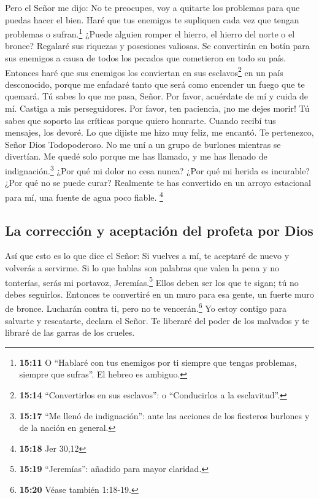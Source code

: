  Pero el Señor me dijo: No te preocupes, voy a quitarte
los problemas para que puedas hacer el bien. Haré que tus enemigos te
supliquen cada vez que tengan problemas o sufran.\footnote{\textbf{15:11}
  O ``Hablaré con tus enemigos por ti siempre que tengas problemas,
  siempre que sufras''. El hebreo es ambiguo.}  ¿Puede
alguien romper el hierro, el hierro del norte o el bronce?
 Regalaré sus riquezas y posesiones valiosas. Se
convertirán en botín para sus enemigos a causa de todos los pecados que
cometieron en todo su país.  Entonces haré que sus
enemigos los conviertan en sus esclavos\footnote{\textbf{15:14}
  ``Convertirlos en sus esclavos'': o ``Conducirlos a la esclavitud''.}
en un país desconocido, porque me enfadaré tanto que será como encender
un fuego que te quemará.  Tú sabes lo que me pasa, Señor.
Por favor, acuérdate de mí y cuida de mí. Castiga a mis perseguidores.
Por favor, ten paciencia, ¡no me dejes morir! Tú sabes que soporto las
críticas porque quiero honrarte.  Cuando recibí tus
mensajes, los devoré. Lo que dijiste me hizo muy feliz, me encantó. Te
pertenezco, Señor Dios Todopoderoso.  No me uní a un
grupo de burlones mientras se divertían. Me quedé solo porque me has
llamado, y me has llenado de indignación.\footnote{\textbf{15:17} ``Me
  llenó de indignación'': ante las acciones de los fiesteros burlones y
  de la nación en general.}  ¿Por qué mi dolor no cesa
nunca? ¿Por qué mi herida es incurable? ¿Por qué no se puede curar?
Realmente te has convertido en un arroyo estacional para mí, una fuente
de agua poco fiable. \footnote{\textbf{15:18} Jer 30,12}

\hypertarget{la-correcciuxf3n-y-aceptaciuxf3n-del-profeta-por-dios}{%
\subsection{La corrección y aceptación del profeta por
Dios}\label{la-correcciuxf3n-y-aceptaciuxf3n-del-profeta-por-dios}}

 Así que esto es lo que dice el Señor: Si vuelves a mí,
te aceptaré de nuevo y volverás a servirme. Si lo que hablas son
palabras que valen la pena y no tonterías, serás mi portavoz,
Jeremías.\footnote{\textbf{15:19} ``Jeremías'': añadido para mayor
  claridad.} Ellos deben ser los que te sigan; tú no debes seguirlos.
 Entonces te convertiré en un muro para esa gente, un
fuerte muro de bronce. Lucharán contra ti, pero no te
vencerán.\footnote{\textbf{15:20} Véase también 1:18-19.} Yo estoy
contigo para salvarte y rescatarte, declara el Señor.  Te
liberaré del poder de los malvados y te libraré de las garras de los
crueles.

